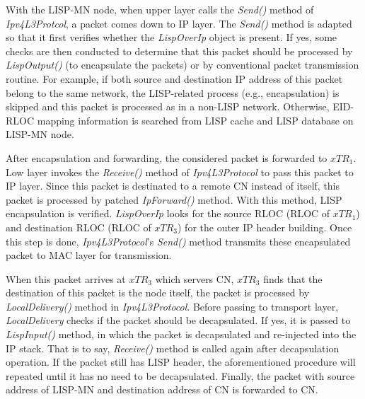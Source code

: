 With the LISP-MN node, when upper layer calls the \emph{Send()} method of \emph{Ipv4L3Protcol}, a packet comes down to IP layer. The \emph{Send()} method is adapted so that it first verifies whether the \emph{LispOverIp} object is present. If yes, some checks are then conducted to determine that this packet should be processed by \emph{LispOutput()} (to encapsulate the packets) or by conventional packet transmission routine. For example, if both source and destination IP address of this packet belong to the same network, the LISP-related process (e.g., encapsulation) is skipped and this packet is processed as in a non-LISP network. Otherwise, EID-RLOC mapping information is searched from LISP cache and LISP database on LISP-MN node. 

After encapsulation and forwarding, the considered packet is forwarded to $xTR_1$. %
Low layer invokes the \emph{Receive()} 
method of \emph{Ipv4L3Protocol} to pass this packet to IP layer. Since this packet is destinated to a remote CN instead of itself, this packet is processed by patched \emph{IpForward()} method. %
With this method, LISP encapsulation is verified. \emph{LispOverIp} looks for the source RLOC (RLOC of $xTR_1$) and destination RLOC (RLOC of $xTR_3$) for the outer IP header building. Once this step is done, \emph{Ipv4L3Protocol}'s \emph{Send()} method transmits these encapsulated packet to MAC layer for transmission.

When this packet arrives at $xTR_3$ which servers CN, $xTR_3$ finds that the destination of this packet is the node itself, the packet is processed by \emph{LocalDelivery()} method in \emph{Ipv4L3Protocol}. Before passing to transport layer, \emph{LocalDelivery} checks if the packet should be decapsulated. If yes, it is passed to \emph{LispInput()} method, in which the packet is decapsulated and re-injected into the IP stack. That is to say, \emph{Receive()} method is called again after decapsulation operation. If the packet still has LISP header, the aforementioned procedure will repeated until it has no need to be decapsulated. Finally, the packet with source address of LISP-MN and destination address of CN is forwarded to CN.

